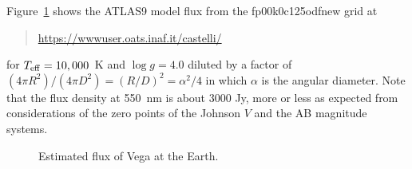 \begin{problem}

Figure~\ref{figure:problem-vega-flux} shows the ATLAS9 model flux from the fp00k0c125odfnew grid at
\begin{quote}
\url{https://wwwuser.oats.inaf.it/castelli/}
\end{quote}
for $T_\mathrm{eff} = 10,000$~K and $\log g = 4.0$ diluted by a factor of $(4\pi R^2)/(4 \pi D^2) = (R/D)^2 = \alpha^2/4$ in which $\alpha$ is the angular diameter. Note that the flux density at 550~nm is about 3000 Jy, more or less as expected from considerations of the zero points of the Johnson $V$ and the AB magnitude systems.

\begin{figure}
\footnotesize
{}
\caption{Estimated flux of Vega at the Earth.}
\label{figure:problem-vega-flux}
\end{figure}

\end{problem}

